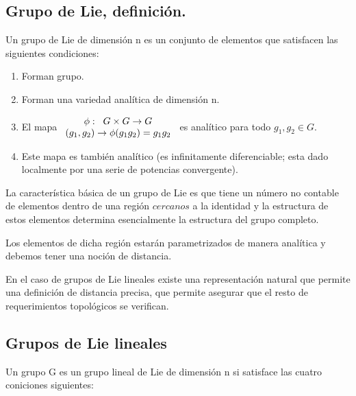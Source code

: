 \documentclass{article}
\begin{document}
 \subsection{Grupo de Lie, definición.}

 Un grupo de Lie de dimensión n es un conjunto de elementos que satisfacen las siguientes condiciones:

 \begin{enumerate}
     \item Forman grupo.
     \item Forman una variedad analítica de dimensión n.
     \item El mapa $\begin{array}{cc}
         \phi: \hspace{0.2cm} G\times G \to G  \\
          (g_1,g_2)\to \phi (g_1g_2)=g_1g_2
     \end{array}$ es analítico para todo $g_1,g_2 \in G$.
     \item Este mapa es también analítico (es infinitamente diferenciable; esta dado localmente por una serie de potencias convergente).
      \end{enumerate}

     La característica básica de un grupo de Lie es que tiene un número no contable de elementos dentro de una región $\textit{cercanos}$ a la identidad y la estructura de estos elementos determina esencialmente la estructura del grupo completo.

     \smallskip
     Los elementos de dicha región estarán parametrizados de manera analítica y debemos tener una noción de distancia.

     En el caso de grupos de Lie lineales existe una representación natural que permite una definición de distancia precisa, que permite asegurar que el resto de requerimientos topológicos se verifican.

     \subsection{Grupos de Lie lineales}

     Un grupo G es un grupo lineal de Lie de dimensión n si satisface las cuatro coniciones siguientes:
\end{document}
